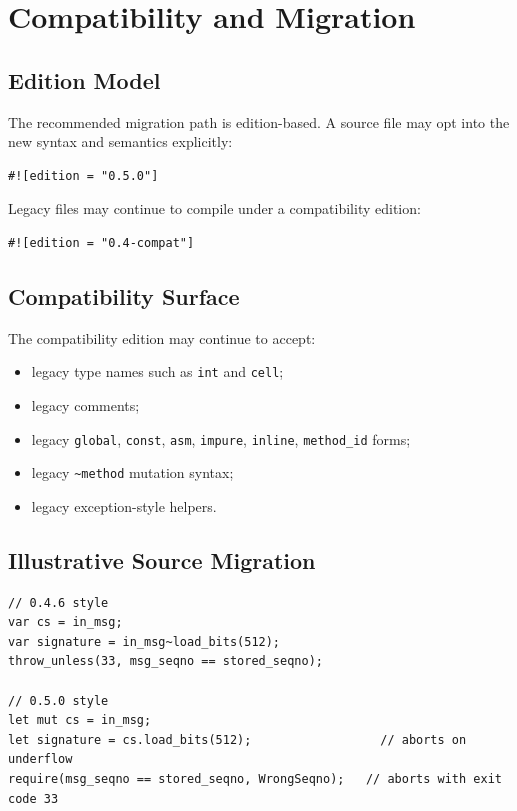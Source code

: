 \documentclass[12pt,oneside]{article}
\begin{document}
\section{Compatibility and Migration}
\subsection{Edition Model}
The recommended migration path is edition-based. A source file may opt into the
new syntax and semantics explicitly:

\begin{verbatim}
#![edition = "0.5.0"]
\end{verbatim}

Legacy files may continue to compile under a compatibility edition:

\begin{verbatim}
#![edition = "0.4-compat"]
\end{verbatim}

\subsection{Compatibility Surface}
The compatibility edition may continue to accept:

\begin{itemize}
\item legacy type names such as \verb|int| and \verb|cell|;
\item legacy comments;
\item legacy \verb|global|, \verb|const|, \verb|asm|, \verb|impure|,
\verb|inline|, \verb|method_id| forms;
\item legacy \verb|~method| mutation syntax;
\item legacy exception-style helpers.
\end{itemize}

\subsection{Illustrative Source Migration}
\begin{verbatim}
// 0.4.6 style
var cs = in_msg;
var signature = in_msg~load_bits(512);
throw_unless(33, msg_seqno == stored_seqno);

// 0.5.0 style
let mut cs = in_msg;
let signature = cs.load_bits(512);                  // aborts on underflow
require(msg_seqno == stored_seqno, WrongSeqno);   // aborts with exit code 33
\end{verbatim}
\end{document}
